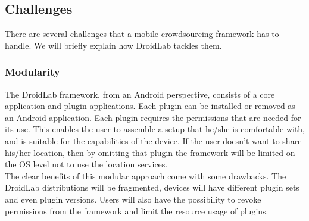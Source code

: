 \documentclass[conference,letterpaper]{IEEEtran}
\begin{document}
\subsection{Challenges}
There are several challenges that a mobile crowdsourcing framework has to handle. We will briefly explain how DroidLab tackles them.
\subsubsection{Modularity}
The DroidLab framework, from an Android perspective, consists of a core application and plugin applications. Each plugin can be installed or removed as an Android application. Each plugin requires the permissions that are needed for its use. This enables the user to assemble a setup that he/she is comfortable with, and is suitable for the capabilities of the device. If the user doesn't want to share his/her location, then by omitting that plugin the framework will be limited on the OS level not to use the location services.\\
\indent The clear benefits of this modular approach come with some drawbacks. The DroidLab distributions will be fragmented, devices will have different plugin sets and even plugin versions. Users will also have the possibility to revoke permissions from the framework and limit the resource usage of plugins.
\end{document}
